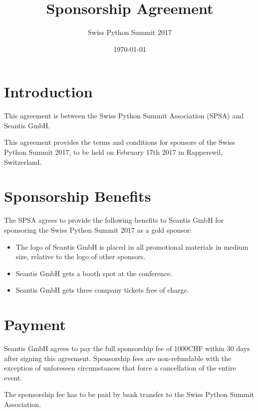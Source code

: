 \documentclass[11pt,enlargefirstpage=true,headlines=4]{scrartcl}
\title{Sponsorship Agreement}
\subtitle{Swiss Python Summit 2017}
\date{\today} %
\begin{document}
    \maketitle

    \section{Introduction}

    This agreement is between the Swiss Python Summit Association (SPSA) and
    Seantis GmbH.

    This agreement provides the terms and conditions for sponsors of the Swiss
    Python Summit 2017, to be held on February 17th 2017 in Rapperswil,
    Switzerland.

    \section{Sponsorship Benefits}

    The SPSA agrees to provide the following benefits to Seantis GmbH for sponsoring
    the Swiss Python Summit 2017 as a gold sponsor:

    \begin{itemize}
        \item The logo of Seantis GmbH is placed in all promotional materials in medium size, relative to the logo of other sponsors.
        \item Seantis GmbH gets a booth spot at the conference.
        \item Seantis GmbH gets three company tickets free of charge.
    \end{itemize}

    \section{Payment}

    Seantis GmbH agrees to pay the full sponsorship fee of 1000CHF within 30 days
    after signing this agreement. Sponsorship fees are non‐refundable with the
    exception of unforeseen circumstances that force a cancellation of the entire
    event.

    The sponsorship fee has to be paid by bank transfer to the Swiss Python
    Summit Association.

    \hspace{\quad}
\end{document}
